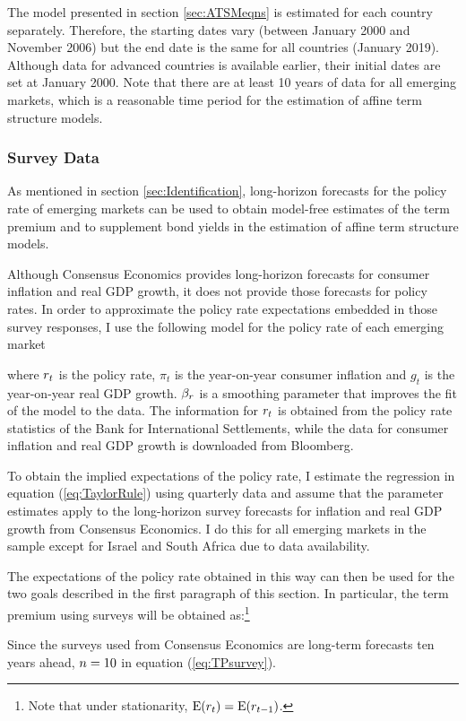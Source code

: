 {The model presented in section \ref{sec:ATSMeqns} is estimated for each country separately. Therefore, the starting dates vary (between January 2000 and November 2006) but the end date is the same for all countries (January 2019). Although data for advanced countries is available earlier, their initial dates are set at January 2000. Note that there are at least 10 years of data for all emerging markets, which is a reasonable time period for the estimation of affine term structure models.
%	

\subsubsection{Survey Data} \label{sec:SurveyData}
As mentioned in section \ref{sec:Identification}, long-horizon forecasts for the policy rate of emerging markets can be used to obtain model-free estimates of the term premium and to supplement bond yields in the estimation of affine term structure models.

Although Consensus Economics provides long-horizon forecasts for consumer inflation and real GDP growth, it does not provide those forecasts for policy rates. In order to approximate the policy rate expectations embedded in those survey responses, I use the following model for the policy rate of each emerging market
	

\noindent where $r_{t}$ is the policy rate, $\pi_{t}$ is the year-on-year consumer inflation and $g_{t}$ is the year-on-year real GDP growth. $\beta_{r}$ is a smoothing parameter that improves the fit of the model to the data. The information for $r_{t}$ is obtained from the policy rate statistics of the Bank for International Settlements, while the data for consumer inflation and real GDP growth is downloaded from Bloomberg.

To obtain the implied expectations of the policy rate, I estimate the regression in equation (\ref{eq:TaylorRule}) using quarterly data and assume that the parameter estimates apply to the long-horizon survey forecasts for inflation and real GDP growth from Consensus Economics. I do this for all emerging markets in the sample except for Israel and South Africa due to data availability.

The expectations of the policy rate obtained in this way can then be used for the two goals described in the first paragraph of this section. In particular, the term premium using surveys will be obtained as:\footnote{Note that under stationarity, $\mathrm{E}(r_{t}) = \mathrm{E}(r_{t-1})$.}
	

Since the surveys used from Consensus Economics are long-term forecasts ten years ahead, $n = 10$ in equation (\ref{eq:TPsurvey}).

}{}	%


